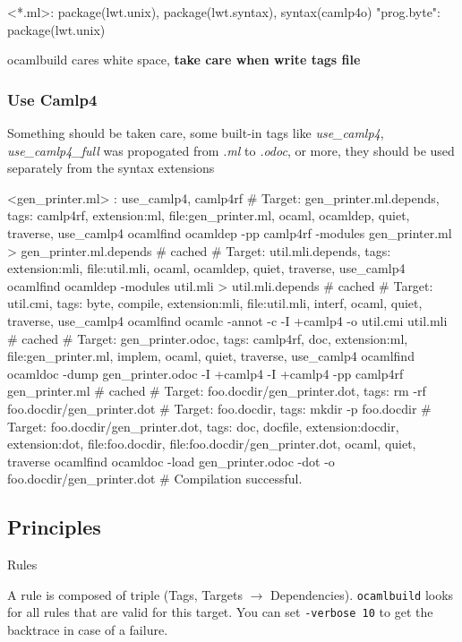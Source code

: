 \begin{bashcode}
<*.ml>: package(lwt.unix), package(lwt.syntax), syntax(camlp4o)
"prog.byte": package(lwt.unix)
\end{bashcode}

ocamlbuild cares white space, \textbf{ take care when write tags file}
\subsubsection{Use Camlp4}

Something should be taken care, some built-in tags like
\textit{use_camlp4}, \textit{use_camlp4_full} was propogated
from \textit{.ml} to \textit{.odoc}, or more, they should be
used separately from the syntax extensions

\begin{bashcode}
  <gen_printer.ml> : use_camlp4, camlp4rf
  # Target: gen_printer.ml.depends, tags: { camlp4rf, extension:ml, file:gen_printer.ml, ocaml, ocamldep, quiet, traverse, use_camlp4 }
ocamlfind ocamldep -pp camlp4rf -modules gen_printer.ml > gen_printer.ml.depends # cached
  # Target: util.mli.depends, tags: { extension:mli, file:util.mli, ocaml, ocamldep, quiet, traverse, use_camlp4 }
ocamlfind ocamldep -modules util.mli > util.mli.depends # cached
  # Target: util.cmi, tags: { byte, compile, extension:mli, file:util.mli, interf, ocaml, quiet, traverse, use_camlp4 }
ocamlfind ocamlc -annot -c -I +camlp4 -o util.cmi util.mli # cached
  # Target: gen_printer.odoc, tags: { camlp4rf, doc, extension:ml, file:gen_printer.ml, implem, ocaml, quiet, traverse, use_camlp4 }
ocamlfind ocamldoc -dump gen_printer.odoc -I +camlp4 -I +camlp4 -pp camlp4rf gen_printer.ml # cached
  # Target: foo.docdir/gen_printer.dot, tags: {  }
  rm -rf foo.docdir/gen_printer.dot
# Target: foo.docdir, tags: {  }
mkdir -p foo.docdir
# Target: foo.docdir/gen_printer.dot, tags: { doc, docfile, extension:docdir, extension:dot, file:foo.docdir, file:foo.docdir/gen_printer.dot, ocaml, quiet, traverse }
ocamlfind ocamldoc -load gen_printer.odoc -dot -o foo.docdir/gen_printer.dot
# Compilation successful.
\end{bashcode}

\subsection{Principles}
Rules 

A rule is composed of triple (Tags, Targets $\rightarrow$ Dependencies).
\verb|ocamlbuild| looks for all rules that are valid for this target.
You can set \verb|-verbose 10| to get the backtrace in case of a
failure.

